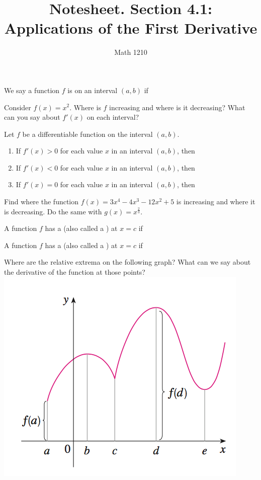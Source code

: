 \documentclass[12pt, a4paper]{article}
\author{Math 1210}
\title{Notesheet. Section 4.1: Applications of the First Derivative}
\date{}
\begin{document}
\maketitle
\nameline
\begin{defi}
  We say a function \(f\) is  on an interval \((a,b)\)
  if
\end{defi}
\begin{ex}
  Consider \(f(x) = x^2\). Where is \(f\) increasing and where is it
  decreasing? What can you say about \(f'(x)\) on each interval?
\end{ex}
\begin{thrm} Let \(f\) be a differentiable function on the interval \((a,b)\).
  \begin{enumerate}
  \item If \(f'(x) > 0\) for each value \(x\) in an interval
    \((a,b)\), then
  \item If \(f'(x) < 0\) for each value \(x\) in an interval
    \((a,b)\), then
  \item If \(f'(x) = 0\) for each value \(x\) in an interval \((a,b)\),
    then
  \end{enumerate}
\end{thrm}
\pagebreak
\begin{ex}
  Find where the function \(f(x) = 3x^4 - 4x^3 - 12x^2 + 5\) is
  increasing and where it is decreasing. Do the same with \(g(x) =
  x^\frac{2}{3}\).
\end{ex}
\begin{defi}
  A function \(f\) has a  (also called a ) at \(x=c\) if
\end{defi}
\begin{defi}
  A function \(f\) has a  (also called a ) at \(x=c\) if
\end{defi}
\begin{ex}
  Where are the relative extrema on the following graph? What can we
  say about the derivative of the function at those points?\\
  \includegraphics[scale=0.5]{images/graph-with-extrema}
\end{ex}

\end{document}
